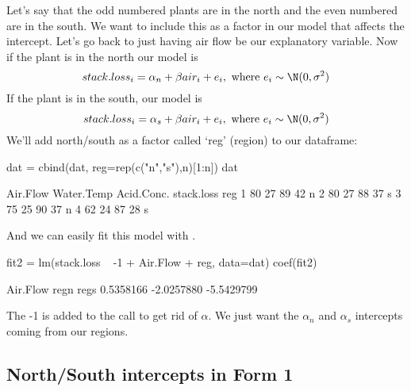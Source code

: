 Let's say that the odd numbered plants are in the north and the even numbered are in the south. We want to include this as a factor in our model that affects the intercept.  Let's go back to just having air flow be our explanatory variable.  Now if the plant is in the north our model is
\begin{equation}
stack.loss_i = \alpha_n + \beta air_i + e_i, \text{ where } e_i \sim \N(0,\sigma^2) 
\end{equation}
If the plant is in the south, our model is
\begin{equation}
stack.loss_i = \alpha_s + \beta air_i + e_i, \text{ where } e_i \sim \N(0,\sigma^2) 
\end{equation}
We'll add north/south as a factor called `reg' (region) to our dataframe:
\begin{Schunk}
\begin{Sinput}
 dat = cbind(dat, reg=rep(c("n","s"),n)[1:n])
 dat
\end{Sinput}
\begin{Soutput}
  Air.Flow Water.Temp Acid.Conc. stack.loss reg
1       80         27         89         42   n
2       80         27         88         37   s
3       75         25         90         37   n
4       62         24         87         28   s
\end{Soutput}
\end{Schunk}
And we can easily fit this model with \verb@lm@.
\begin{Schunk}
\begin{Sinput}
 fit2 = lm(stack.loss ~ -1 + Air.Flow + reg, data=dat)
 coef(fit2)
\end{Sinput}
\begin{Soutput}
  Air.Flow       regn       regs 
 0.5358166 -2.0257880 -5.5429799 
\end{Soutput}
\end{Schunk}
The -1 is added to the \verb@lm@ call to get rid of $\alpha$.  We just want the $\alpha_n$ and $\alpha_s$ intercepts coming from our regions.  

\subsection{North/South intercepts in Form 1}

